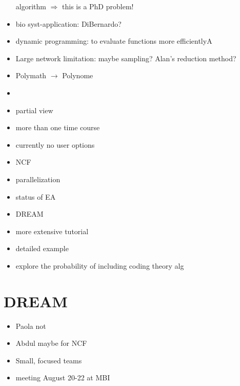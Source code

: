 \documentclass[10pt]{article}
\begin{document}
\begin{itemize}
    algorithm $\Rightarrow$ this is a PhD problem!
    \item bio syst-application: DiBernardo?
    \item dynamic programming: to evaluate functions more efficientlyA
    \item Large network limitation: maybe sampling? Alan's reduction method?
    \item Polymath $\rightarrow$ Polynome
    \item {}
    \item partial view
    \item more than one time course
    \item currently no user options
    \item NCF
    \item parallelization
    \item status of EA
    \item DREAM
    \item more extensive tutorial
    \item detailed example
    \item explore the probability of including coding theory alg
\end{itemize}
\section*{DREAM}
\begin{itemize}
    \item Paola not
    \item Abdul maybe for NCF
    \item Small, focused teams 
    \item meeting August 20-22 at MBI
\end{itemize}
%


%

\end{document}
